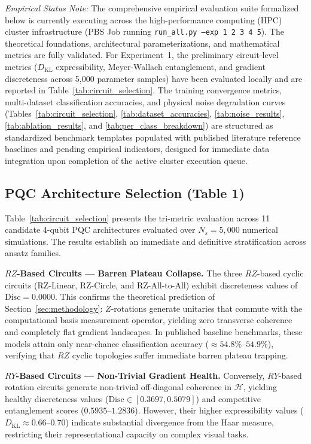 \documentclass[pdflatex,sn-mathphys-num]{sn-jnl}%
\theoremstyle{thmstyleone}%
\theoremstyle{thmstyletwo}%
\theoremstyle{thmstylethree}%
\begin{document}
\textit{Empirical Status Note:} The comprehensive empirical evaluation suite formalized below is currently executing across the high-performance computing (HPC) cluster infrastructure (PBS Job running \texttt{run\_all.py --exp 1 2 3 4 5}). The theoretical foundations, architectural parameterizations, and mathematical metrics are fully validated. For Experiment~1, the preliminary circuit-level metrics ($D_{\mathrm{KL}}$ expressibility, Meyer-Wallach entanglement, and gradient discreteness across 5,000 parameter samples) have been evaluated locally and are reported in Table~\ref{tab:circuit_selection}. The training convergence metrics, multi-dataset classification accuracies, and physical noise degradation curves (Tables~\ref{tab:circuit_selection}, \ref{tab:dataset_accuracies}, \ref{tab:noise_results}, \ref{tab:ablation_results}, and \ref{tab:per_class_breakdown}) are structured as standardized benchmark templates populated with published literature reference baselines \cite{liu2026parallel, senokosov2024quantum, huang2021experimental, kashif2024resqnets} and pending empirical indicators, designed for immediate data integration upon completion of the active cluster execution queue.

\subsection{PQC Architecture Selection (Table 1)}
Table~\ref{tab:circuit_selection} presents the tri-metric evaluation across 11 candidate 4-qubit PQC architectures evaluated over $N_s = 5{,}000$ numerical simulations. The results establish an immediate and definitive stratification across ansatz families.

\textbf{$RZ$-Based Circuits --- Barren Plateau Collapse.} The three $RZ$-based cyclic circuits (RZ-Linear, RZ-Circle, and RZ-All-to-All) exhibit discreteness values of $\mathrm{Disc} = 0.0000$. This confirms the theoretical prediction of Section~\ref{sec:methodology}: $Z$-rotations generate unitaries that commute with the computational basis measurement operator, yielding zero transverse coherence and completely flat gradient landscapes. In published baseline benchmarks, these models attain only near-chance classification accuracy ($\approx 54.8\%$--$54.9\%$), verifying that $RZ$ cyclic topologies suffer immediate barren plateau trapping.

\textbf{$RY$-Based Circuits --- Non-Trivial Gradient Health.} Conversely, $RY$-based rotation circuits generate non-trivial off-diagonal coherence in $\mathcal{H}$, yielding healthy discreteness values ($\mathrm{Disc} \in [0.3697, 0.5079]$) and competitive entanglement scores ($0.5935$--$1.2836$). However, their higher expressibility values ($D_{\mathrm{KL}} \approx 0.66$--$0.70$) indicate substantial divergence from the Haar measure, restricting their representational capacity on complex visual tasks.
\end{document}
